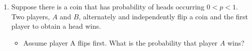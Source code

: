 \documentclass[10pt,twoside]{article}\usepackage[]{graphicx}\usepackage[dvipsnames,svgnames,table]{xcolor}
\begin{document}
\begin{enumerate}
    \item Suppose there is a coin that has probability of heads occurring $0 < p < 1$. 
    Two players, $A$ and $B$, alternately and independently flip a coin and the first player to obtain a head wins. 
    \begin{itemize}
      \item Assume player A flips first. What is the probability that player $A$ wins?
    \end{itemize}
    
\end{enumerate}
\end{document}
